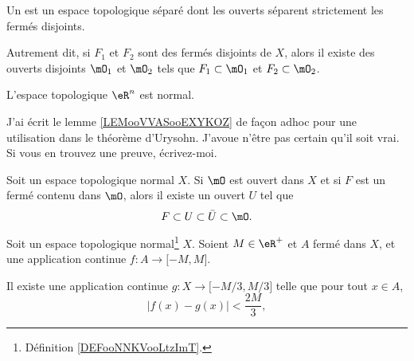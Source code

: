 \begin{definition}      \label{DEFooNNKVooLtzImT}
    Un  est un espace topologique séparé dont les ouverts séparent strictement les fermés disjoints.

    Autrement dit, si \( F_1\) et \( F_2\) sont des fermés disjoints de \( X\), alors il existe des ouverts disjoints \( \mO_1\) et \( \mO_2\) tels que  \( F_1\subset\mO_1\) et \( F_2\subset \mO_2\).
\end{definition}

\begin{proposition}     \label{PROPooWSKZooHKvuob}
    L'espace topologique \( \eR^n\) est normal.
\end{proposition}


\begin{probleme}
    J'ai écrit le lemme \ref{LEMooVVASooEXYKOZ} de façon adhoc pour une utilisation dans le théorème d'Urysohn. J'avoue n'être pas certain qu'il soit vrai. Si vous en trouvez une preuve, écrivez-moi.
\end{probleme}

\begin{lemma}        \label{LEMooVVASooEXYKOZ}
    Soit un espace topologique normal \( X\). Si \( \mO\) est ouvert dans \( X\) et si \( F\) est un fermé contenu dans \( \mO\), alors il existe un ouvert \( U\) tel que
    \begin{equation}
        F\subset U\subset\bar U\subset \mO.
    \end{equation}
\end{lemma}

\begin{lemma}     \label{LEMooCLVAooTaNGJk}
    Soit un espace topologique normal\footnote{Définition \ref{DEFooNNKVooLtzImT}.} \( X\). Soient \( M\in \eR^+\) et \( A\) fermé dans \( X\), et une application continue \( f\colon A\to \mathopen[ -M , M \mathclose]\).

    Il existe une application continue \( g\colon X\to \mathopen[ -M/3 , M/3 \mathclose]\) telle que pour tout \( x\in A\),
            \begin{equation}
                | f(x)-g(x) |<\frac{ 2M }{ 3 },
            \end{equation}
\end{lemma}

